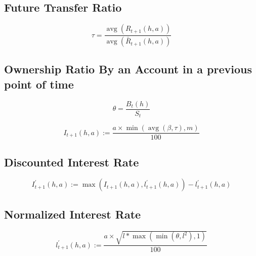 \begin{tcolorbox}
	\subsection{ Future Transfer Ratio }
	\begin{equation}
		\tau=\frac{\operatorname{avg}\left(R_{t+1}(h, a)\right)}{\operatorname{avg}\left(\bar{R}_{t+1}(h, a)\right)}
	\end{equation}
\end{tcolorbox}

\begin{tcolorbox}
	\subsection{ Ownership Ratio By an Account in a previous point of time }
	\begin{equation}
		\theta=\frac{B_{t}(h)}{S_{t}}
	\end{equation}
\end{tcolorbox}

\begin{tcolorbox}
	\label{Interest Rate}
	\begin{equation}
		I_{t+1}(h, a):=\frac{a \times \min (\operatorname{avg}(\beta, \tau), m)}{100}
	\end{equation}
\end{tcolorbox}

\begin{tcolorbox}
	\subsection{Discounted Interest Rate}
	\label{Discounted Interest Rate}
	\begin{equation}
		I_{t+1}^{\prime}(h, a):=\max \left(I_{t+1}(h, a), l_{t+1}^{\prime}(h, a)\right)-l_{t+1}^{\prime}(h, a)
	\end{equation}
\end{tcolorbox}


\begin{tcolorbox}
	\subsection{Normalized Interest Rate}
	\label{Normalized Interest Rate }
	\begin{equation}
		l_{t+1}^{\prime}(h, a):=\frac{a \times \sqrt{l * \max \left(\min \left(\theta, l^{2}\right), 1\right)}}{100}
	\end{equation}
\end{tcolorbox}



